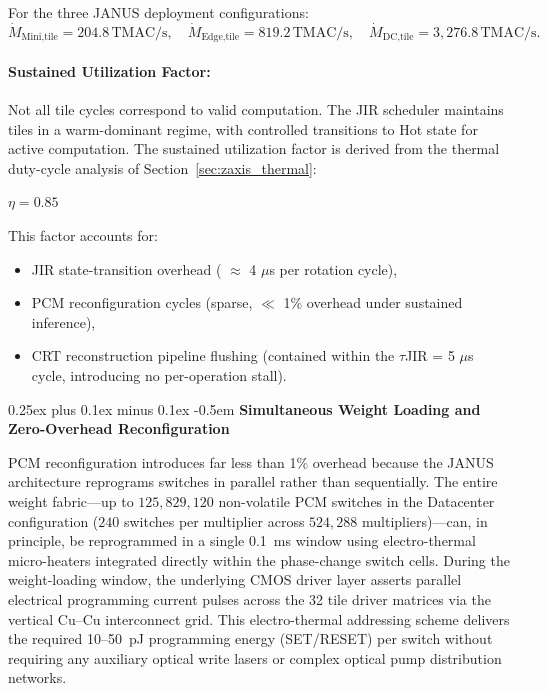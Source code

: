 \documentclass[journal]{IEEEtran}
\makeatletter
\newcommand{\subparagraph}{\@startsection{subparagraph}{5}{\parindent}%
  {0.25ex plus 0.1ex minus 0.1ex}%
  {-0.5em}%
  {\normalfont\normalsize\itshape}} %
\makeatother
\begin{document}
For the three JANUS deployment configurations:
\begin{equation}
\dot{M}_{\text{Mini,tile}} = 204.8\,\text{TMAC/s}, \quad \dot{M}_{\text{Edge,tile}} = 819.2\,\text{TMAC/s}, \quad \dot{M}_{\text{DC,tile}} = 3,276.8\,\text{TMAC/s}.
\end{equation}

\paragraph{\textbf{Sustained Utilization Factor:}}

Not all tile cycles correspond to valid computation. The JIR scheduler maintains tiles in a warm-dominant regime, with controlled transitions to Hot state for active computation. The sustained utilization factor is derived from the thermal duty-cycle analysis of Section~\ref{sec:zaxis_thermal}:

$\eta = 0.85$

This factor accounts for:

\begin{itemize}
\item JIR state-transition overhead ( $\approx$ 4 $\mu$s per rotation cycle),
\item PCM reconfiguration cycles (sparse, $\ll$ 1\% overhead under sustained inference),
\item  CRT reconstruction pipeline flushing (contained within the $\tau$JIR = 5 $\mu$s cycle, introducing no per-operation stall).
\end{itemize}

\subparagraph{\textbf{Simultaneous Weight Loading and Zero-Overhead Reconfiguration}}

PCM reconfiguration introduces far less than 1\% overhead because the JANUS architecture reprograms switches in parallel rather than sequentially. The entire weight fabric---up to $125,829,120$ non-volatile PCM switches in the Datacenter configuration ($240$ switches per multiplier across $524,288$ multipliers)---can, in principle, be reprogrammed in a single 0.1~ms window using electro-thermal micro-heaters integrated directly within the phase-change switch cells. During the weight-loading window, the underlying CMOS driver layer asserts parallel electrical programming current pulses across the 32 tile driver matrices via the vertical Cu--Cu interconnect grid. This electro-thermal addressing scheme delivers the required 10--50~pJ programming energy (SET/RESET) per switch without requiring any auxiliary optical write lasers or complex optical pump distribution networks.
\end{document}
